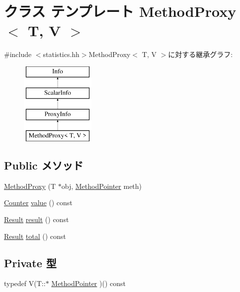 \hypertarget{classStats_1_1MethodProxy}{
\section{クラス テンプレート MethodProxy$<$ T, V $>$}
\label{classStats_1_1MethodProxy}
}


{\ttfamily \#include $<$statistics.hh$>$}MethodProxy$<$ T, V $>$に対する継承グラフ:\begin{figure}[H]
\begin{center}
\leavevmode
\includegraphics[height=4cm]{classStats_1_1MethodProxy}
\end{center}
\end{figure}
\subsection*{Public メソッド}
\begin{DoxyCompactItemize}
\item 
\hyperlink{classStats_1_1MethodProxy_ab5b8549f1ee4086ccef8082ec75093f7}{MethodProxy} (T $\ast$obj, \hyperlink{classStats_1_1MethodProxy_a731f64ce330eb760150e934a69327210}{MethodPointer} meth)
\item 
\hyperlink{namespaceStats_ac35128c026c72bb36af9cea00774e8a6}{Counter} \hyperlink{classStats_1_1MethodProxy_aa9e486cb7eb0ad44f5f89923594b68a4}{value} () const 
\item 
\hyperlink{namespaceStats_ad874d2cfd4b4a29ebd480bb2e67f20ae}{Result} \hyperlink{classStats_1_1MethodProxy_ae050da86c3d8e8a677a0bdeb7971e1e3}{result} () const 
\item 
\hyperlink{namespaceStats_ad874d2cfd4b4a29ebd480bb2e67f20ae}{Result} \hyperlink{classStats_1_1MethodProxy_a35c6e2ed3fc81b40d69052a062113ead}{total} () const 
\end{DoxyCompactItemize}
\subsection*{Private 型}
\begin{DoxyCompactItemize}
\item 
typedef V(T::$\ast$ \hyperlink{classStats_1_1MethodProxy_a731f64ce330eb760150e934a69327210}{MethodPointer} )() const 
\end{DoxyCompactItemize}
